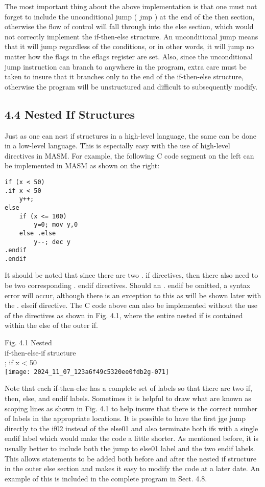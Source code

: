 \documentclass[10pt]{article}
\begin{document}
The most important thing about the above implementation is that one must not forget to include the unconditional jump ( $j \mathrm{mp}$ ) at the end of the then section, otherwise the flow of control will fall through into the else section, which would not correctly implement the if-then-else structure. An unconditional jump means that it will jump regardless of the conditions, or in other words, it will jump no matter how the flags in the eflags register are set. Also, since the unconditional jump instruction can branch to anywhere in the program, extra care must be taken to insure that it branches only to the end of the if-then-else structure, otherwise the program will be unstructured and difficult to subsequently modify.

\subsection*{4.4 Nested If Structures}
Just as one can nest if structures in a high-level language, the same can be done in a low-level language. This is especially easy with the use of high-level directives in MASM. For example, the following C code segment on the left can be implemented in MASM as shown on the right:

\begin{verbatim}
if (x < 50)
.if x < 50
    y++;
else
    if (x <= 100)
        y=0; mov y,0
    else .else
        y--; dec y
.endif
.endif
\end{verbatim}

It should be noted that since there are two . if directives, then there also need to be two corresponding . endif directives. Should an . endif be omitted, a syntax error will occur, although there is an exception to this as will be shown later with the . elseif directive. The C code above can also be implemented without the use of the directives as shown in Fig. 4.1, where the entire nested if is contained within the else of the outer if.

Fig. 4.1 Nested\\
if-then-else-if structure\\
; if x < 50\\
\texttt{[image: 2024\_11\_07\_123a6f49c5320ee0fdb2g-071]}

Note that each if-then-else has a complete set of labels so that there are two if, then, else, and endif labels. Sometimes it is helpful to draw what are known as scoping lines as shown in Fig. 4.1 to help insure that there is the correct number of labels in the appropriate locations. It is possible to have the first jge jump directly to the if02 instead of the else01 and also terminate both ifs with a single endif label which would make the code a little shorter. As mentioned before, it is usually better to include both the jump to else01 label and the two endif labels. This allows statements to be added both before and after the nested if structure in the outer else section and makes it easy to modify the code at a later date. An example of this is included in the complete program in Sect. 4.8.
\end{document}
